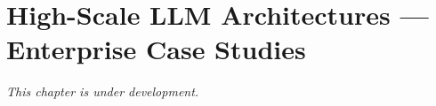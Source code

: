 \chapter{High-Scale LLM Architectures --- Enterprise Case Studies}
\label{ch:enterprise-scale}

\textit{This chapter is under development.}
